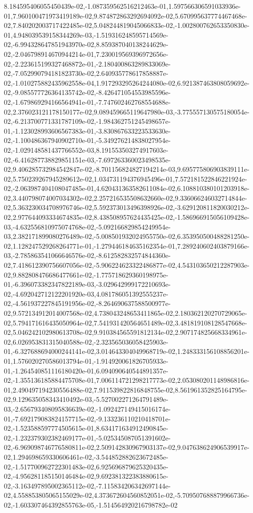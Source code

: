 8.184595406055450439e-02,-1.087359562516212463e-01,1.597566306591033936e-01,7.960100471973419189e-02,9.874872863292694092e-02,5.670995637774467468e-02,7.840202003717422485e-02,5.048244819045066833e-02,-1.002800762653350830e-01,4.948039539158344269e-03,-1.519316248595714569e-02,-6.994328647851943970e-02,8.859387040138244629e-02,-2.046798914670944214e-01,7.230019569396972656e-02,-2.223615199327468872e-01,-2.180400863289833069e-02,-7.052990794181823730e-02,2.640935778617858887e-02,-1.010275882435962558e-04,1.917293295264244080e-02,6.921387463808059692e-02,-9.085577726364135742e-02,-8.426471054553985596e-02,-1.679869294166564941e-01,-7.747602462768554688e-02,2.376023121178150177e-02,9.089459665119647980e-03,-3.775557130575180054e-02,-6.213700771331787109e-02,-1.984362751245498657e-01,-1.123028993606567383e-01,-3.830867633223533630e-02,-1.100486367940902710e-01,-5.349276214838027954e-02,-1.029148581437766552e-03,8.191553503274917603e-02,-6.416287738829851151e-03,-7.697263360023498535e-02,9.406285732984542847e-02,-8.701156824827194214e-03,9.695775806903839111e-02,5.750239267945289612e-02,1.034731194376945496e-01,7.572181522846221924e-02,-2.063987404108047485e-01,4.620431363582611084e-02,6.108810380101203918e-02,3.440798074007034302e-02,2.257216535508632660e-02,9.336066246032714844e-02,5.363230034708976746e-02,5.592373013496398926e-02,-3.629120811820030212e-02,2.977644093334674835e-02,8.438508957624435425e-02,-1.586966915056109428e-03,-4.632556810975074768e-02,-5.092166829854249954e-03,2.382171899080276489e-02,-5.008501932024955750e-02,6.353950500488281250e-02,1.128247529268264771e-01,-1.279446184635162354e-01,7.289240602403879166e-03,-2.785863541066646576e-02,-8.612582832574844360e-02,7.418612390756607056e-02,-5.906224623322486877e-02,4.543103650212287903e-02,9.882808476686477661e-02,-1.775718629360198975e-01,-6.396073382347822189e-03,-3.029642999172210693e-02,-4.692042712122201920e-03,4.081786051392555237e-02,-4.561937227845191956e-02,-8.264690637588500977e-02,9.572134912014007568e-02,4.738043248653411865e-02,2.180362120270729065e-02,5.794171616435050964e-02,7.541931420564651489e-02,3.481819108128547668e-02,5.046242102980613708e-02,9.910384565591812134e-02,2.907174825668334961e-02,6.026953831315040588e-02,-2.323565036058425903e-01,-6.327688694000244141e-02,3.014643304049968719e-02,1.248333156108856201e-01,1.576020270586013794e-01,-1.914920061826705933e-01,-1.264540851116180420e-01,6.094090640544891357e-02,-1.355136185884475708e-01,7.006114721298217773e-02,2.053080201148986816e-01,2.490497194230556488e-02,7.911539822816848755e-02,8.561961352825164795e-02,9.129635058343410492e-03,-5.527002271264791489e-03,-2.656793408095836639e-02,-1.092427149415016174e-01,-7.692179083824157715e-02,-9.133236110210418701e-02,-1.523588597774505615e-01,8.634171634912490845e-02,-1.232379302382469177e-01,-5.025345087051391602e-02,-6.969098746776580811e-02,2.509142830967903137e-02,9.047638624906539917e-02,1.294698659330606461e-02,-3.544852882623672485e-02,-1.517700962722301483e-02,6.925696879625320435e-02,-4.956281185150146484e-02,9.692381322383880615e-02,-3.163497895002365112e-02,-7.115834206342697144e-02,4.558853805065155029e-02,4.373672604560852051e-02,-5.709507688879966736e-02,-1.603307464392855763e-05,-1.514564920216798782e-02
